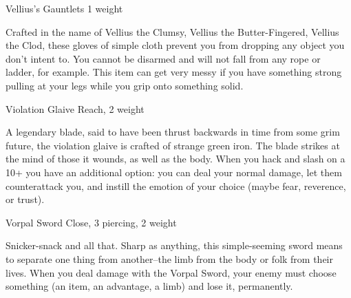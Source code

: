  Vellius's Gauntlets 1 weight


 Crafted in the name of Vellius the Clumsy, Vellius the Butter-Fingered, Vellius the Clod, these gloves of simple cloth prevent you from dropping any object you don't intent to. You cannot be disarmed and will not fall from any rope or ladder, for example. This item can get very messy if you have something strong pulling at your legs while you grip onto something solid.


 Violation Glaive Reach, 2 weight


 A legendary blade, said to have been thrust backwards in time from some grim future, the violation glaive is crafted of strange green iron. The blade strikes at the mind of those it wounds, as well as the body. When you hack and slash on a 10+ you have an additional option: you can deal your normal damage, let them counterattack you, and instill the emotion of your choice (maybe fear, reverence, or trust).


 Vorpal Sword Close, 3 piercing, 2 weight


 Snicker-snack and all that. Sharp as anything, this simple-seeming sword means to separate one thing from another--the limb from the body or folk from their lives. When you deal damage with the Vorpal Sword, your enemy must choose something (an item, an advantage, a limb) and lose it, permanently.



